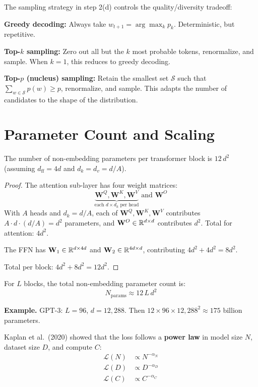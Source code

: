 \documentclass[main.tex]{subfiles}
\begin{document}
The sampling strategy in step 2(d) controls the quality/diversity tradeoff:

\textbf{Greedy decoding:} Always take $w_{t+1} = \arg\max_k p_k$. Deterministic, but repetitive.

\textbf{Top-$k$ sampling:} Zero out all but the $k$ most probable tokens, renormalize, and sample. When $k = 1$, this reduces to greedy decoding.

\textbf{Top-$p$ (nucleus) sampling:} Retain the smallest set $\mathcal{S}$ such that $\sum_{w \in \mathcal{S}} p(w) \geq p$, renormalize, and sample. This adapts the number of candidates to the shape of the distribution.

\needspace{0.33\textheight}
\section{Parameter Count and Scaling}

\begin{proposition}
The number of non-embedding parameters per transformer block is $12\,d^2$ (assuming $d_{\text{ff}} = 4d$ and $d_k = d_v = d/A$).
\end{proposition}

\begin{proof}
The attention sub-layer has four weight matrices:
$$\underbrace{\mathbf{W}^Q, \mathbf{W}^K, \mathbf{W}^V}_{\text{each } d \times d_k \text{ per head}} \text{ and } \mathbf{W}^O$$
With $A$ heads and $d_k = d/A$, each of $\mathbf{W}^Q, \mathbf{W}^K, \mathbf{W}^V$ contributes $A \cdot d \cdot (d/A) = d^2$ parameters, and $\mathbf{W}^O \in \mathbb{R}^{d \times d}$ contributes $d^2$. Total for attention: $4d^2$.

The FFN has $\mathbf{W}_1 \in \mathbb{R}^{d \times 4d}$ and $\mathbf{W}_2 \in \mathbb{R}^{4d \times d}$, contributing $4d^2 + 4d^2 = 8d^2$.

Total per block: $4d^2 + 8d^2 = 12d^2$.
\end{proof}

For $L$ blocks, the total non-embedding parameter count is:
$$N_{\text{params}} \approx 12\, L\, d^2$$

\textbf{Example.} GPT-3: $L = 96$, $d = 12{,}288$. Then $12 \times 96 \times 12{,}288^2 \approx 175$ billion parameters.

Kaplan et al.\ (2020) showed that the loss follows a \textbf{power law} in model size $N$, dataset size $D$, and compute $C$:
\begin{align}
\mathcal{L}(N) &\propto N^{-\alpha_N} \\[4pt]
\mathcal{L}(D) &\propto D^{-\alpha_D} \\[4pt]
\mathcal{L}(C) &\propto C^{-\alpha_C}
\end{align}
\end{document}
